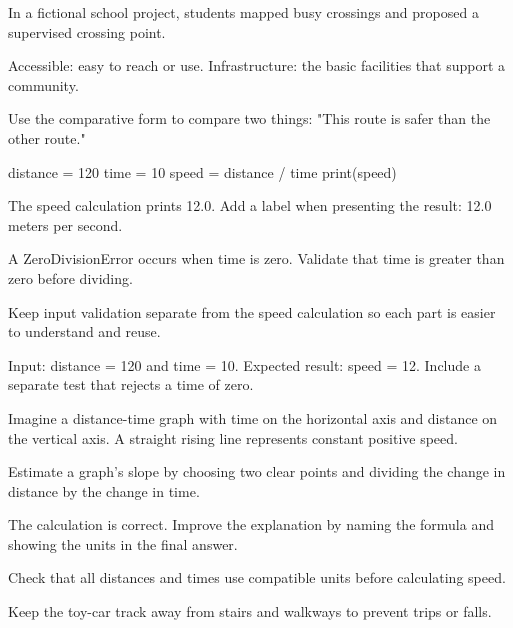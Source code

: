 \documentclass[11pt]{article}
\begin{document}
\begin{casebox}
In a fictional school project, students mapped busy crossings and proposed a supervised crossing point.
\end{casebox}

\begin{vocabularybox}
Accessible: easy to reach or use. Infrastructure: the basic facilities that support a community.
\end{vocabularybox}

\begin{grammarbox}
Use the comparative form to compare two things: "This route is safer than the other route."
\end{grammarbox}

\begin{codebox}
distance = 120
time = 10
speed = distance / time
print(speed)
\end{codebox}

\begin{outputbox}
The speed calculation prints 12.0. Add a label when presenting the result: 12.0 meters per second.
\end{outputbox}

\begin{debugbox}
A ZeroDivisionError occurs when time is zero. Validate that time is greater than zero before dividing.
\end{debugbox}

\begin{designbox}
Keep input validation separate from the speed calculation so each part is easier to understand and reuse.
\end{designbox}

\begin{testbox}
Input: distance = 120 and time = 10. Expected result: speed = 12. Include a separate test that rejects a time of zero.
\end{testbox}

\begin{figurebox}
Imagine a distance-time graph with time on the horizontal axis and distance on the vertical axis. A straight rising line represents constant positive speed.
\end{figurebox}

\begin{techniquebox}
Estimate a graph's slope by choosing two clear points and dividing the change in distance by the change in time.
\end{techniquebox}

\begin{feedbackbox}
The calculation is correct. Improve the explanation by naming the formula and showing the units in the final answer.
\end{feedbackbox}

\begin{warning}
Check that all distances and times use compatible units before calculating speed.
\end{warning}

\begin{danger}
Keep the toy-car track away from stairs and walkways to prevent trips or falls.
\end{danger}
\end{document}
